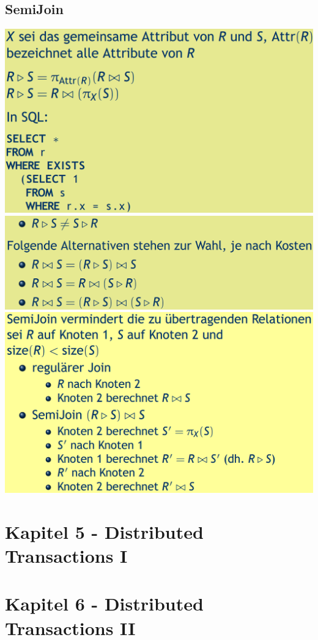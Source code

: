 \documentclass[a4paper,11pt]{article}
\begin{document}
\subsection{SemiJoin}
\includegraphics[width=15cm]{src/semijoin.png}\\
\includegraphics[width=15cm]{src/semijoin2.png}\\
\includegraphics[width=15cm]{src/semijoin3.png}
\section{Kapitel 5 - Distributed Transactions I}
\section{Kapitel 6 - Distributed Transactions II}
\end{document}
